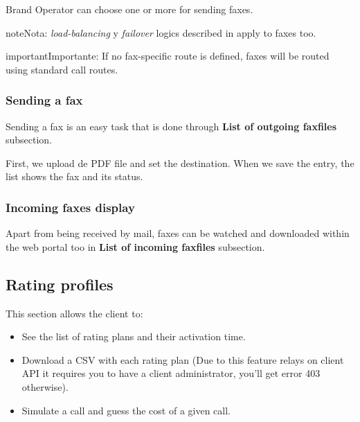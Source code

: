 \documentclass[letterpaper,10pt,spanish]{sphinxmanual}
\begin{document}
Brand Operator can choose one or more {\hyperref[administration_portal/brand/routing/outgoing_routings:outgoing\string-routings]{}} for sending faxes.

\begin{notice}{note}{Nota:}
\emph{load-balancing} y \emph{failover} logics described in {\hyperref[administration_portal/brand/routing/outgoing_routings:outgoing\string-routings]{}}
apply to faxes too.
\end{notice}

\begin{notice}{important}{Importante:}
If no fax-specific route is defined, faxes will be routed using
standard call routes.
\end{notice}


\subsubsection{Sending a fax}
\label{administration_portal/client/residential/faxes:sending-a-fax}
Sending a fax is an easy task that is done through \textbf{List of outgoing faxfiles} subsection.

First, we upload de PDF file and set the destination. When we save the entry, the list shows the fax and its status.


\subsubsection{Incoming faxes display}
\label{administration_portal/client/residential/faxes:incoming-faxes-display}
Apart from being received by mail, faxes can be watched and downloaded within
the web portal too in \textbf{List of incoming faxfiles} subsection.


\subsection{Rating profiles}
\label{administration_portal/client/residential/rating_profiles:rating-profiles}\label{administration_portal/client/residential/rating_profiles::doc}
This section allows the client to:
\begin{itemize}
\item {} 
See the list of rating plans and their activation time.

\item {} 
Download a CSV with each rating plan (Due to this feature relays on client API it requires you to have a client administrator, you'll get error 403 otherwise).

\item {} 
Simulate a call and guess the cost of a given call.

\end{itemize}
\end{document}
